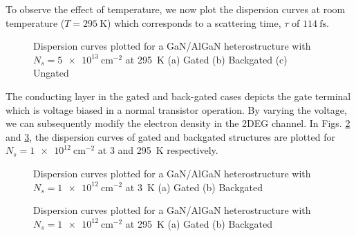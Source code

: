 To observe the effect of temperature, we now plot the dispersion curves at room temperature ($T = \SI{295}{\kelvin}$) which corresponds to a scattering time, $\tau$ of $\SI{114}{\fs}$.
\begin{figure}[!htbp]
  \centering
   \hfil
  \caption{Dispersion curves plotted for a GaN/AlGaN heterostructure with $N_s = \SI{5e13}{\cm^{-2}}$ at \SI{295}{\kelvin} (a) Gated (b) Backgated (c) Ungated}
  \label{fig:dispersion_hif_hiT}
\end{figure}
%

The conducting layer in the gated and back-gated cases depicts the gate terminal which is voltage biased in a normal transistor operation. By varying the voltage, we can subsequently modify the electron density in the 2DEG channel. In Figs. \ref{fig:dispersion_lof_lowT} and \ref{fig:dispersion_lof_hiT}, the dispersion curves of gated and backgated structures are plotted for $N_s = \SI{1e12}{\cm^{-2}}$ at \SI{3}{} and \SI{295}{\kelvin} respectively.
\begin{figure}[!htbp]
  \begin{center}
  \caption{Dispersion curves plotted for a GaN/AlGaN heterostructure with $N_s = \SI{1e12}{\cm^{-2}}$ at \SI{3}{\kelvin} (a) Gated (b) Backgated}
  \label{fig:dispersion_lof_lowT}
  \end{center}
\end{figure}
%

\begin{figure}[!htbp]
  \begin{center}
  \caption{Dispersion curves plotted for a GaN/AlGaN heterostructure with $N_s = \SI{1e12}{\cm^{-2}}$ at \SI{295}{\kelvin} (a) Gated (b) Backgated}
  \label{fig:dispersion_lof_hiT}
  \end{center}
\end{figure}

